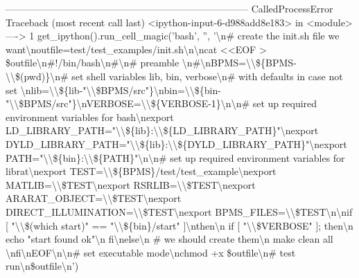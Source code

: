 \documentclass[letterpaper,10pt,english]{sphinxmanual}
\begin{document}
{
\begin{sphinxVerbatim}[commandchars=\\\{\}]
\textcolor{ansi-red}{---------------------------------------------------------------------------}
\textcolor{ansi-red}{CalledProcessError}                        Traceback (most recent call last)
\textcolor{ansi-green}{<ipython-input-6-d988add8e183>} in \textcolor{ansi-cyan}{<module>}
\textcolor{ansi-green}{----> 1}\textcolor{ansi-red}{ }get\_ipython\textcolor{ansi-blue}{(}\textcolor{ansi-blue}{)}\textcolor{ansi-blue}{.}run\_cell\_magic\textcolor{ansi-blue}{(}\textcolor{ansi-blue}{'bash'}\textcolor{ansi-blue}{,} \textcolor{ansi-blue}{''}\textcolor{ansi-blue}{,} \textcolor{ansi-blue}{'\textbackslash{}n\# create the init.sh file we want\textbackslash{}noutfile=test/test\_examples/init.sh\textbackslash{}n\textbackslash{}ncat <<EOF > \$outfile\textbackslash{}n\#!/bin/bash\textbackslash{}n\#\textbackslash{}n\# preamble \textbackslash{}n\#\textbackslash{}nBPMS=\textbackslash{}\textbackslash{}\$\{BPMS-\textbackslash{}\textbackslash{}\$(pwd)\}\textbackslash{}n\# set shell variables lib, bin, verbose\textbackslash{}n\# with defaults in case not set \textbackslash{}nlib=\textbackslash{}\textbackslash{}\$\{lib-"\textbackslash{}\textbackslash{}\$BPMS/src"\}\textbackslash{}nbin=\textbackslash{}\textbackslash{}\$\{bin-"\textbackslash{}\textbackslash{}\$BPMS/src"\}\textbackslash{}nVERBOSE=\textbackslash{}\textbackslash{}\$\{VERBOSE-1\}\textbackslash{}n\textbackslash{}n\# set up required environment variables for bash\textbackslash{}nexport LD\_LIBRARY\_PATH="\textbackslash{}\textbackslash{}\$\{lib\}:\textbackslash{}\textbackslash{}\$\{LD\_LIBRARY\_PATH\}"\textbackslash{}nexport DYLD\_LIBRARY\_PATH="\textbackslash{}\textbackslash{}\$\{lib\}:\textbackslash{}\textbackslash{}\$\{DYLD\_LIBRARY\_PATH\}"\textbackslash{}nexport PATH="\textbackslash{}\textbackslash{}\$\{bin\}:\textbackslash{}\textbackslash{}\$\{PATH\}"\textbackslash{}n\textbackslash{}n\# set up required environment variables for librat\textbackslash{}nexport TEST=\textbackslash{}\textbackslash{}\$\{BPMS\}/test/test\_example\textbackslash{}nexport MATLIB=\textbackslash{}\textbackslash{}\$TEST\textbackslash{}nexport RSRLIB=\textbackslash{}\textbackslash{}\$TEST\textbackslash{}nexport ARARAT\_OBJECT=\textbackslash{}\textbackslash{}\$TEST\textbackslash{}nexport DIRECT\_ILLUMINATION=\textbackslash{}\textbackslash{}\$TEST\textbackslash{}nexport BPMS\_FILES=\textbackslash{}\textbackslash{}\$TEST\textbackslash{}n\textbackslash{}nif [ "\textbackslash{}\textbackslash{}\$(which start)" == "\textbackslash{}\textbackslash{}\$\{bin\}/start" ]\textbackslash{}nthen\textbackslash{}n  if [ "\textbackslash{}\textbackslash{}\$VERBOSE" ]; then\textbackslash{}n      echo "start found ok"\textbackslash{}n  fi\textbackslash{}nelse\textbackslash{}n  \# we should create them\textbackslash{}n  make clean all \textbackslash{}nfi\textbackslash{}nEOF\textbackslash{}n\textbackslash{}n\# set executable mode\textbackslash{}nchmod +x \$outfile\textbackslash{}n\# test run\textbackslash{}n\$outfile\textbackslash{}n'}\textcolor{ansi-blue}{)}


\end{sphinxVerbatim}}
\end{document}
